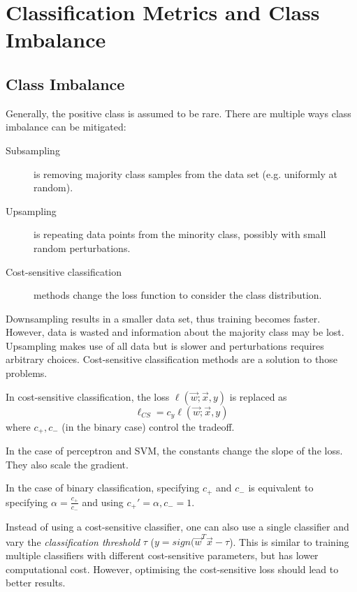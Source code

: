 \section{Classification Metrics and Class Imbalance}

\subsection{Class Imbalance}
Generally, the positive class is assumed to be rare.
There are multiple ways class imbalance can be mitigated:

\begin{description}
    \item[Subsampling] is removing majority class samples
    from the data set (e.g. uniformly at random).
    \item[Upsampling] is repeating data points from the
    minority class, possibly with small random perturbations.
    \item[Cost-sensitive classification] methods change
    the loss function to consider the class distribution.
\end{description}

Downsampling results in a smaller data set, thus training
becomes faster. However, data is wasted and information about
the majority class may be lost.
Upsampling makes use of all data but is slower and
perturbations requires arbitrary choices.
Cost-sensitive classification methods are a solution
to those problems.

In cost-sensitive classification,
the loss $\ell(\vec{w}; \vec{x}, y)$ is replaced as
\begin{equation*}
    \ell_{CS} = c_y \ell(\vec{w}; \vec{x}, y)
\end{equation*}
where $c_{+}, c_{-}$ (in the binary case) control the tradeoff.

In the case of perceptron and SVM, the constants change the
slope of the loss.
They also scale the gradient.

In the case of binary classification, specifying
$c_{+}$ and $c_{-}$ is equivalent to specifying
$\alpha = \frac{c_{+}}{c_{-}}$ and using
$c_{+}' = \alpha, c_{-} = 1$.

Instead of using a cost-sensitive classifier,
one can also use a single classifier and vary the
\emph{classification threshold} $\tau$
($y = sign(\vec{w}^T \vec{x} - \tau$).
This is similar to training multiple classifiers with
different cost-sensitive parameters, but has lower
computational cost.
However, optimising the cost-sensitive loss should lead to better results.


